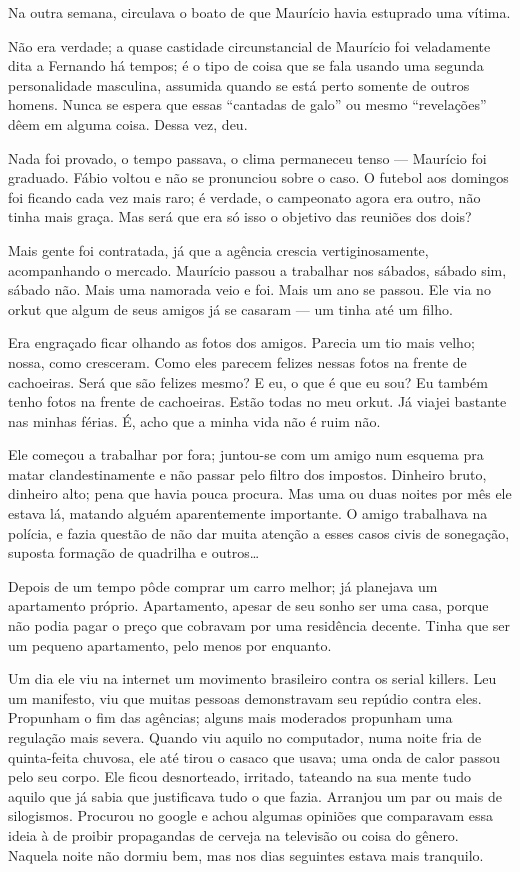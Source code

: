 Na outra semana, circulava o boato de que Maurício havia estuprado uma vítima.

Não era verdade; a quase castidade circunstancial de Maurício foi veladamente dita a Fernando há tempos; é o tipo de coisa que se fala usando uma segunda personalidade masculina, assumida quando se está perto somente de outros homens. Nunca se espera que essas ``cantadas de galo'' ou mesmo ``revelações'' dêem em alguma coisa. Dessa vez, deu.

Nada foi provado, o tempo passava, o clima permaneceu tenso --- Maurício foi graduado. Fábio voltou e não se pronunciou sobre o caso. O futebol aos domingos foi ficando cada vez mais raro; é verdade, o campeonato agora era outro, não tinha mais graça. Mas será que era só isso o objetivo das reuniões dos dois?

Mais gente foi contratada, já que a agência crescia vertiginosamente, acompanhando o mercado. Maurício passou a trabalhar nos sábados, sábado sim, sábado não. Mais uma namorada veio e foi. Mais um ano se passou. Ele via no orkut que algum de seus amigos já se casaram --- um tinha até um filho.

Era engraçado ficar olhando as fotos dos amigos. Parecia um tio mais velho; nossa, como cresceram. Como eles parecem felizes nessas fotos na frente de cachoeiras. Será que são felizes mesmo? E eu, o que é que eu sou? Eu também tenho fotos na frente de cachoeiras. Estão todas no meu orkut. Já viajei bastante nas minhas férias. É, acho que a minha vida não é ruim não.

Ele começou a trabalhar por fora; juntou-se com um amigo num esquema pra matar clandestinamente e não passar pelo filtro dos impostos. Dinheiro bruto, dinheiro alto; pena que havia pouca procura. Mas uma ou duas noites por mês ele estava lá, matando alguém aparentemente importante. O amigo trabalhava na polícia, e fazia questão de não dar muita atenção a esses casos civis de sonegação, suposta formação de quadrilha e outros\ldots 

Depois de um tempo pôde comprar um carro melhor; já planejava um apartamento próprio. Apartamento, apesar de seu sonho ser uma casa, porque não podia pagar o preço que cobravam por uma residência decente. Tinha que ser um pequeno apartamento, pelo menos por enquanto.

Um dia ele viu na internet um movimento brasileiro contra os serial killers. Leu um manifesto, viu que muitas pessoas demonstravam seu repúdio contra eles. Propunham o fim das agências; alguns mais moderados propunham uma regulação mais severa. Quando viu aquilo no computador, numa noite fria de quinta-feita chuvosa, ele até tirou o casaco que usava; uma onda de calor passou pelo seu corpo. Ele ficou desnorteado, irritado, tateando na sua mente tudo aquilo que já sabia que justificava tudo o que fazia. Arranjou um par ou mais de silogismos. Procurou no google e achou algumas opiniões que comparavam essa ideia à de proibir propagandas de cerveja na televisão ou coisa do gênero. Naquela noite não dormiu bem, mas nos dias seguintes estava mais tranquilo.

